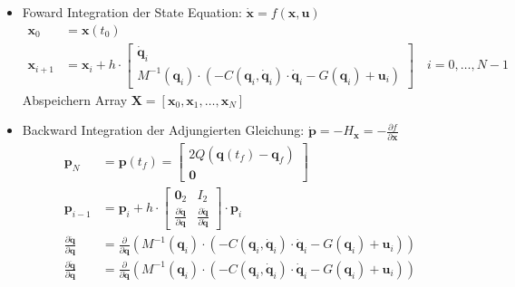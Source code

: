 \documentclass[a4paper, 12pt]{scrartcl}
\begin{document}
\begin{itemize}
    \item[1)] Foward Integration der State Equation: $\dot{\bm{x}}=f(\bm{x},\bm{u})$
    \begin{align*}
        \bm{x}_0 &= \bm{x}(t_0) \\
        \bm{x}_{i+1} 
        &=
        \bm{x}_i + h \cdot
        \begin{bmatrix}
            \bm{\dot{q}}_i \\
            M^{-1}(\bm{q}_i) \cdot ( - C(\bm{q}_i,\bm{\dot{q}}_i) \cdot \bm{\dot{q}}_i - G(\bm{q}_i) + \bm{u}_i )
        \end{bmatrix}
        \quad i = 0, \ldots, N-1
    \end{align*}
    Abspeichern Array $\bm{X} = [\bm{x}_0, \bm{x}_1, \ldots, \bm{x}_N]$
    \item[2)] Backward Integration der Adjungierten Gleichung: 
    $\dot{\bm{p}} = - H_{\bm{x}} = - \frac{\partial f}{\partial \bm{x}}$
    \begin{align*}
        \bm{p}_N 
        &= \bm{p}(t_f) 
        = 
        \begin{bmatrix}
            2 Q (\bm{q}(t_f) - \bm{q}_f) \\
            \bm{0}
        \end{bmatrix} \\
        \bm{p}_{i-1} 
        &= \bm{p}_{i} + h  \cdot
        \begin{bmatrix}
           \bm{0}_2 & I_2 \\
            \frac{\partial \ddot{\bm{q}}}{\partial \bm{q}}
           &
           \frac{\partial \ddot{\bm{q}}}{\partial \bm{\dot{q}}}
        \end{bmatrix}
        \cdot \bm{p}_{i} \\
        \frac{\partial \ddot{\bm{q}}}{\partial \bm{q}} 
        &=
        \frac{\partial}{\partial \bm{q}} 
        \left( 
            M^{-1}(\bm{q}_i) \cdot ( - C(\bm{q}_i,\bm{\dot{q}}_i) \cdot \bm{\dot{q}}_i 
            - G(\bm{q}_i) + \bm{u}_i ) 
            \right) 
            \\
        \frac{\partial \ddot{\bm{q}}}{\partial \bm{q}} &= 
        \frac{\partial}{\partial \bm{\dot{q}}} \left( 
            M^{-1}(\bm{q}_i) \cdot ( - C(\bm{q}_i,\bm{\dot{q}}_i) 
            \cdot \bm{\dot{q}}_i - G(\bm{q}_i) + \bm{u}_i ) 
            \right)
    \end{align*}
    \begin{itemize}

\end{itemize}
\end{itemize}
\end{document}
